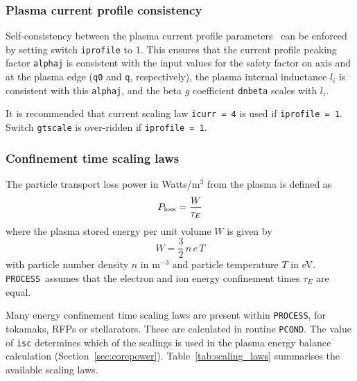 \documentclass[11pt,a4paper]{report}
\newcommand{\process}{\mbox{\texttt{PROCESS}}}
\begin{document}
\subsubsection{Plasma current profile consistency}
\label{sec:current_profile}

Self-consistency between the plasma current profile
parameters~\cite{DEMOPhysicsGuidelines} can be enforced by setting switch
\texttt{iprofile} to 1. This ensures that the current profile peaking factor
\texttt{alphaj} is consistent with the input values for the safety factor on
axis and at the plasma edge (\texttt{q0} and \texttt{q}, respectively), the
plasma internal inductance $l_i$ is consistent with this \texttt{alphaj}, and
the beta $g$ coefficient \texttt{dnbeta} scales with $l_i$.

It is recommended that current scaling law \texttt{icurr = 4} is used if
\texttt{iprofile = 1}. Switch \texttt{gtscale} is over-ridden if
\texttt{iprofile = 1}.

\subsubsection{Confinement time scaling laws}
\label{sec:taue}

The particle transport loss power in Watts/m$^3$ from the plasma is defined as
\begin{equation}
P_{\mbox{\scriptsize loss}} = \frac{W}{\tau_E}
\label{eqn:ploss}
\end{equation}
where the plasma stored energy per unit volume $W$ is given by
\[
W = \frac{3}{2} \,n \, e \, T
\]
with particle number density $n$ in m$^{-3}$ and particle temperature $T$ in
eV. \process\ assumes that the electron and ion energy confinement times
$\tau_E$ are equal.

Many energy confinement time scaling laws are present within \process, for
tokamaks, RFPs or stellarators. These are calculated in routine
\texttt{PCOND}. The value of \texttt{isc} determines which of the scalings is
used in the plasma energy balance calculation (Section~\ref{sec:corepower}).
Table~\ref{tab:scaling_laws} summarises the available scaling laws.
\end{document}
